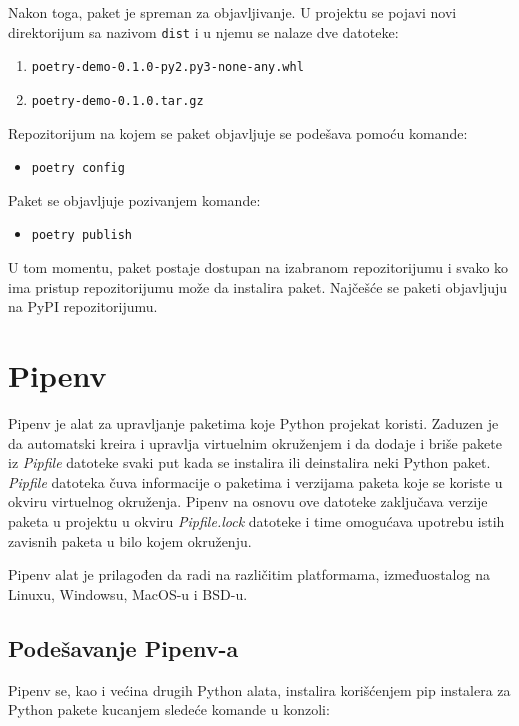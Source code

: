 \documentclass[12pt]{report}
\begin{document}
Nakon toga, paket je spreman za objavljivanje. U projektu se pojavi novi direktorijum sa nazivom \texttt{dist} i u njemu se nalaze dve datoteke:

\begin{enumerate}
    \item \texttt{poetry-demo-0.1.0-py2.py3-none-any.whl}
    \item \texttt{poetry-demo-0.1.0.tar.gz}
\end{enumerate}

Repozitorijum na kojem se paket objavljuje se podešava pomoću komande:

\begin{itemize}
    \item \texttt{poetry config}
\end{itemize}

Paket se objavljuje pozivanjem komande:

\begin{itemize}
    \item \texttt{poetry publish}
\end{itemize}

U tom momentu, paket postaje dostupan na izabranom repozitorijumu i svako ko ima pristup repozitorijumu može da instalira paket. Najčešće se paketi objavljuju na PyPI repozitorijumu.

\section{Pipenv}
Pipenv \cite{pipenv} je alat za upravljanje paketima koje Python projekat koristi. Zaduzen je da automatski kreira i upravlja virtuelnim okruženjem i da dodaje i briše pakete iz \textit{Pipfile} datoteke svaki put kada se instalira ili deinstalira neki Python paket. \textit{Pipfile} datoteka čuva informacije o paketima i verzijama paketa koje se koriste u okviru virtuelnog okruženja. Pipenv na osnovu ove datoteke zaključava verzije paketa u projektu u okviru \textit{Pipfile.lock} datoteke i time omogućava upotrebu istih zavisnih paketa u bilo kojem okruženju.

Pipenv alat je prilagođen da radi na različitim platformama, izmeđuostalog na Linux­u, Windows­u, MacOS-u i BSD-u.

\subsection{Podešavanje Pipenv-a}

Pipenv se, kao i većina drugih Python alata, instalira korišćenjem pip instalera za Python pakete kucanjem sledeće komande u konzoli:
\end{document}
